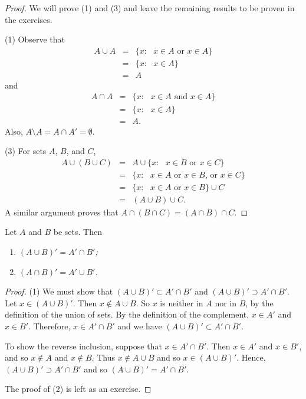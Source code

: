 \begin{proof}
We will prove (1) and (3) and leave the remaining results to be proven in the exercises. 

(1)
Observe that
\begin{eqnarray*}
A \cup A & = & \{ x : \mbox{ $x \in A$ or $x \in A$} \} \\
& = & \{ x : \mbox{ $x \in A$} \} \\
& = & A
\end{eqnarray*}
and
\begin{eqnarray*}
A \cap A & = & \{ x : \mbox{ $x \in A$ and $x \in A$} \} \\
& = & \{ x : \mbox{ $x \in A$}  \} \\
& = & A.
\end{eqnarray*}
Also, $A \setminus A = A \cap A' = \emptyset$.
 
(3)
For sets $A$, $B$, and $C$,
\begin{eqnarray*}
A \cup (B \cup C)
& = &
A \cup \{ x : \mbox{ $x \in B$ or $x \in C$} \} \\
& = &
\{ x : \mbox{ $x \in A$ or $x \in B$, or $x \in C$} \} \\
& = &
\{ x : \mbox{ $x \in A$ or $x \in B$} \} \cup C \\
& = &
(A \cup B) \cup C.
\end{eqnarray*}
A  similar argument proves that  $A \cap (B \cap C) = (A \cap B) \cap
C$. 
\end{proof}
 
\begin{theorem}\label{sets_theorem_2}
Let $A$ and $B$ be sets. Then 
\begin{enumerate}
 
\rm \item \it
$(A \cup B)' = A' \cap B'$; 
 
\rm \item \it
$(A \cap B)' = A' \cup B'$.
 
\end{enumerate}
\end{theorem}
 
\begin{proof}
(1) 
We must show that $(A \cup B)' \subset A' \cap B'$ and $(A \cup B)' \supset A' \cap B'$. Let $x \in (A \cup B)'$.  Then $x \notin A \cup B$. So $x$ is neither in $A$ nor in $B$, by the definition of the union of sets.  By the definition of the complement, $x \in A'$ and $x \in B'$.  Therefore, $x \in A' \cap B'$ and we have $(A \cup B)' \subset A' \cap B'$.
 
To show the reverse inclusion, suppose that $x \in A' \cap B'$.  Then $x \in A'$ and $x \in B'$, and so $x \notin A$ and $x \notin B$.  Thus $x \notin A \cup B$ and so $x \in (A \cup B)'$.  Hence, $(A \cup B)' \supset A' \cap B'$ and so $(A \cup B)' = A' \cap B'$. 

The proof of (2) is left as an exercise.
\end{proof}
 
